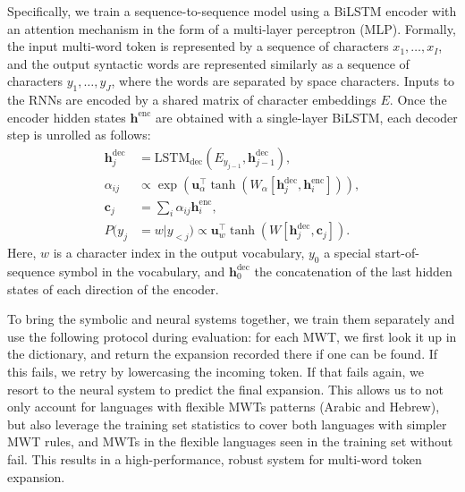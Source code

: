\documentclass[11pt,a4paper]{article}
\begin{document}
Specifically, we train a sequence-to-sequence model using a BiLSTM encoder with an attention mechanism \cite{bahdanau2014neural} in the form of a multi-layer perceptron (MLP).
Formally, the input multi-word token is represented by a sequence of characters $x_1, \ldots, x_I$, and the output syntactic words are represented similarly as a sequence of characters $y_{1}, \ldots, y_J$, where the words are separated by space characters.
Inputs to the RNNs are encoded by a shared matrix of character embeddings $E$.
Once the encoder hidden states $\mathbf{h}^{\text{enc}}$ are obtained with a single-layer BiLSTM, each decoder step is unrolled as follows:
\begin{align}
\mathbf{h}^{\text{dec}}_j &= \text{LSTM}_{\text{dec}}(E_{y_{j-1}}, \mathbf{h}^{\text{dec}}_{j-1}),\\
\alpha_{ij} &\propto \exp(\mathbf{u}^{\top}_\alpha \tanh (W_\alpha[\mathbf{h}^{\text{dec}}_j, \mathbf{h}^{\text{enc}}_i])),\\
\mathbf{c}_{j} &= \sum_i \alpha_{ij} \mathbf{h}^{\text{enc}}_i, \\
P(y_{j}&=w|y_{<j}) \propto \mathbf{u}_w^\top \tanh (W[\mathbf{h}^{\text{dec}}_j, \mathbf{c}_j]).
\end{align}
Here, $w$ is a character index in the output vocabulary, $y_0$ a special start-of-sequence symbol in the vocabulary, and $\mathbf{h}^{\text{dec}}_0$ the concatenation of the last hidden states of each direction of the encoder.

To bring the symbolic and neural systems together, we train them separately and use the following protocol during evaluation:
for each MWT, we first look it up in the dictionary, and return the expansion recorded there if one can be found.
If this fails, we retry by lowercasing the incoming token.
If that fails again, we resort to the neural system to predict the final expansion.
This allows us to not only account for languages with flexible MWTs patterns (Arabic and Hebrew), but also leverage the training set statistics to cover both languages with simpler MWT rules, and MWTs in the flexible languages seen in the training set without fail.
This results in a high-performance, robust system for multi-word token expansion.
\end{document}
